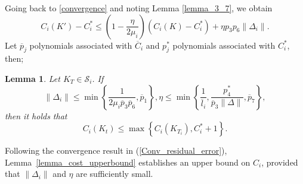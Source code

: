 \documentclass[letterpaper, 10 pt, conference]{ieeeconf}  %
\newtheorem{lemma}{Lemma}
\begin{document}
Going back to \ref{convergence} and noting Lemma \ref{lemma_3_7}, we obtain
\begin{equation}
\label{Conv_residual_error}
    C_i(K') - C_i^* \leq (1 - \frac{\eta}{2\mu_i}) (C_i(K) - C_i^*) + \eta p_3 p_6 \|\Delta_i\|.
\end{equation}
Let $\overline{p}_j$ polynomials associated with $\overline{C}_i$ and $p^*_j$ polynomials associated with $C_i^*$, then;
\begin{lemma}
Let \( K_T \in \mathcal{S}_i \).
If 
$$
    \|\Delta_i\| \leq \min \left\{ \frac{1}{2\mu_i \overline{p}_3 \overline{p}_6}, \overline{p}_1 \right\}, \eta \leq \min \left\{ \frac{1}{\overline{l}_i}, \frac{p^*_4}{\overline{p}_3 \|\Delta\|}, \overline{p}_7\right\},
$$
then it holds that 
\begin{equation}
    C_i(K_{t}) \leq \max \left\{ C_i(K_{T_i}), C_i^* +1 \right \}.
\end{equation}   
\end{lemma} 
Following the convergence result in (\ref{Conv_residual_error}), Lemma~\ref{lemma_cost_upperbound} establishes an upper bound on $C_i$, provided that $\|\Delta_i\|$ and $\eta$ are sufficiently small. \vspace{2mm} \\
\end{document}

